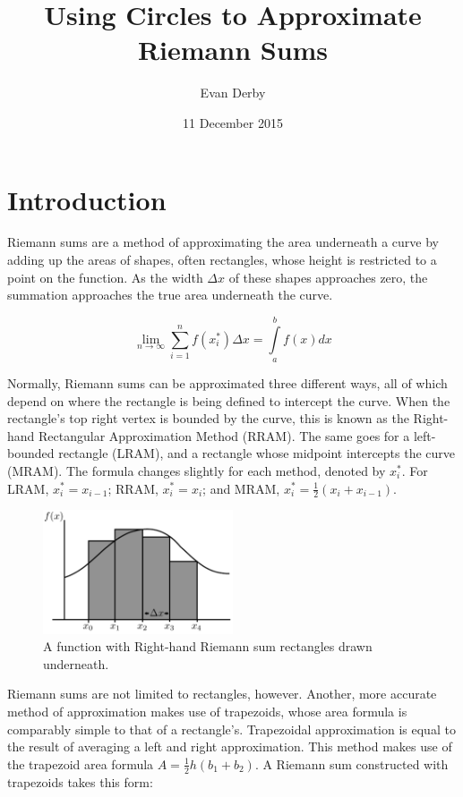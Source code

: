 \documentclass[12pt]{article}
\begin{document}
  \title{Using Circles to Approximate Riemann Sums}
  \author{Evan Derby}
  \date{11 December 2015}
  \maketitle

  \section{Introduction}
    Riemann sums are a method of approximating the area underneath a curve by adding up the areas of shapes, often rectangles, whose height is restricted to a point on the function. As the width \( \Delta x \) of these shapes approaches zero, the summation approaches the true area underneath the curve.

    \[ \displaystyle\lim_{n \to \infty}\sum_{i=1}^{n} f(x^*_i) \Delta x = \int\limits_a^b f(x)dx \]

    Normally, Riemann sums can be approximated three different ways, all of which depend on where the rectangle is being defined to intercept the curve. When the rectangle's top right vertex is bounded by the curve, this is known as the Right-hand Rectangular Approximation Method (RRAM). The same goes for a left-bounded rectangle (LRAM), and a rectangle whose midpoint intercepts the curve (MRAM). The formula changes slightly for each method, denoted by \( x^*_i \). For LRAM, \( x_i^* = x_{i-1} \); RRAM, \( x_i^* = x_i \); and MRAM, \( x_i^* = \frac{1}{2}(x_i + x_{i-1}) \).

    \begin{figure}[h]
      \centering
      \includegraphics[width=0.5\textwidth]{riemann_1}
      \caption{A function with Right-hand Riemann sum rectangles drawn underneath.}
    \end{figure}

    Riemann sums are not limited to rectangles, however. Another, more accurate method of approximation makes use of trapezoids, whose area formula is comparably simple to that of a rectangle's. Trapezoidal approximation is equal to the result of averaging a left and right approximation. This method makes use of the trapezoid area formula \( A = \frac{1}{2}h(b_1+b_2) \). A Riemann sum constructed with trapezoids takes this form:
\end{document}
